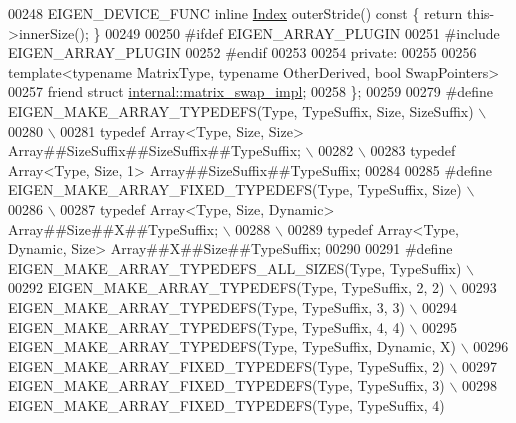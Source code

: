 \begin{DoxyCode}
00248     EIGEN\_DEVICE\_FUNC \textcolor{keyword}{inline} \hyperlink{namespace_eigen_a62e77e0933482dafde8fe197d9a2cfde}{Index} outerStride()\textcolor{keyword}{ const }\{ \textcolor{keywordflow}{return} this->innerSize(); \}
00249 
00250 \textcolor{preprocessor}{    #ifdef EIGEN\_ARRAY\_PLUGIN}
00251 \textcolor{preprocessor}{    #include EIGEN\_ARRAY\_PLUGIN}
00252 \textcolor{preprocessor}{    #endif}
00253 
00254   \textcolor{keyword}{private}:
00255 
00256     \textcolor{keyword}{template}<\textcolor{keyword}{typename} MatrixType, \textcolor{keyword}{typename} OtherDerived, \textcolor{keywordtype}{bool} SwapPo\textcolor{keywordtype}{int}ers>
00257     \textcolor{keyword}{friend} \textcolor{keyword}{struct }\hyperlink{struct_eigen_1_1internal_1_1matrix__swap__impl}{internal::matrix\_swap\_impl};
00258 \};
00259 
00279 \textcolor{preprocessor}{#define EIGEN\_MAKE\_ARRAY\_TYPEDEFS(Type, TypeSuffix, Size, SizeSuffix)   \(\backslash\)}
00280 \textcolor{preprocessor}{                                    \(\backslash\)}
00281 \textcolor{preprocessor}{typedef Array<Type, Size, Size> Array##SizeSuffix##SizeSuffix##TypeSuffix;  \(\backslash\)}
00282 \textcolor{preprocessor}{                                    \(\backslash\)}
00283 \textcolor{preprocessor}{typedef Array<Type, Size, 1>    Array##SizeSuffix##TypeSuffix;}
00284 
00285 \textcolor{preprocessor}{#define EIGEN\_MAKE\_ARRAY\_FIXED\_TYPEDEFS(Type, TypeSuffix, Size)         \(\backslash\)}
00286 \textcolor{preprocessor}{                                    \(\backslash\)}
00287 \textcolor{preprocessor}{typedef Array<Type, Size, Dynamic> Array##Size##X##TypeSuffix;  \(\backslash\)}
00288 \textcolor{preprocessor}{                                    \(\backslash\)}
00289 \textcolor{preprocessor}{typedef Array<Type, Dynamic, Size> Array##X##Size##TypeSuffix;}
00290 
00291 \textcolor{preprocessor}{#define EIGEN\_MAKE\_ARRAY\_TYPEDEFS\_ALL\_SIZES(Type, TypeSuffix) \(\backslash\)}
00292 \textcolor{preprocessor}{EIGEN\_MAKE\_ARRAY\_TYPEDEFS(Type, TypeSuffix, 2, 2) \(\backslash\)}
00293 \textcolor{preprocessor}{EIGEN\_MAKE\_ARRAY\_TYPEDEFS(Type, TypeSuffix, 3, 3) \(\backslash\)}
00294 \textcolor{preprocessor}{EIGEN\_MAKE\_ARRAY\_TYPEDEFS(Type, TypeSuffix, 4, 4) \(\backslash\)}
00295 \textcolor{preprocessor}{EIGEN\_MAKE\_ARRAY\_TYPEDEFS(Type, TypeSuffix, Dynamic, X) \(\backslash\)}
00296 \textcolor{preprocessor}{EIGEN\_MAKE\_ARRAY\_FIXED\_TYPEDEFS(Type, TypeSuffix, 2) \(\backslash\)}
00297 \textcolor{preprocessor}{EIGEN\_MAKE\_ARRAY\_FIXED\_TYPEDEFS(Type, TypeSuffix, 3) \(\backslash\)}
00298 \textcolor{preprocessor}{EIGEN\_MAKE\_ARRAY\_FIXED\_TYPEDEFS(Type, TypeSuffix, 4)}

\end{DoxyCode}
